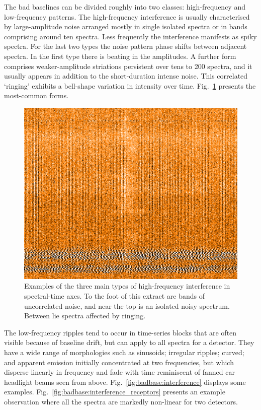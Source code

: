 \documentclass[final,authoryear,5p,times,twocolumn]{elsarticle}
\begin{document}
The bad baselines can be divided roughly into two classes:
high-frequency and low-frequency patterns.  The high-frequency
interference is usually characterised by large-amplitude noise
arranged mostly in single isolated spectra or in bands comprising
around ten spectra.  Less frequently the interference manifests as
spiky spectra.  For the last two types the noise pattern phase shifts
between adjacent spectra.  In the first type there is beating in the
amplitudes.  A further form comprises weaker-amplitude striations
persistent over tens to 200 spectra, and it usually appears in
addition to the short-duration intense noise.  This correlated
`ringing' exhibits a bell-shape variation in intensity over time.
Fig.~\ref{fig:badbase:highfreq} presents the most-common forms.

\begin{figure}[t]
\includegraphics[width=\columnwidth]{high_freq_three_types.png}
\caption{Examples of the three main types of high-frequency
  interference in spectral-time axes.  To the foot of this extract
  are bands of uncorrelated noise, and near the top is an isolated
  noisy spectrum.  Between lie spectra affected by ringing.}
\label{fig:badbase:highfreq}
\end{figure}

The low-frequency ripples tend to occur in time-series blocks that are
often visible because of baseline drift, but can apply to all spectra
for a detector.  They have a wide range of morphologies such as
sinusoids; irregular ripples; curved; and apparent emission initially
concentrated at two frequencies, but which disperse linearly in
frequency and fade with time reminiscent of fanned car headlight
beams seen from above.
Fig.~\ref{fig:badbase:interference} displays some examples.
Fig.~\ref{fig:badbase:interference_receptors} presents an example
observation where all the spectra are markedly non-linear for two
detectors.
\end{document}
